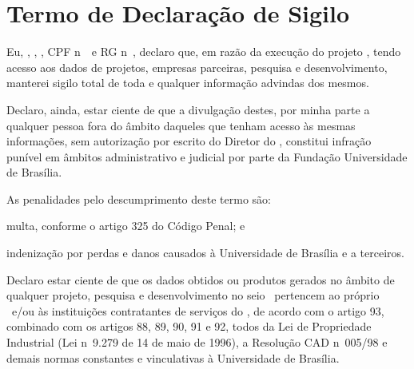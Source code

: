 
\cleardoublepage
   {\centering \section*{Termo de Declaração de Sigilo \label{sec:dec_sigilo}}}
   \vspace{1cm}
   Eu, \textbf{\pesquisador}, \pesqnacionalidade, \pesqestadocivil, CPF n\ele\ \pesqcpf\ e RG n\ele\ \pesqrg, declaro que, em razão da execução do projeto \projeto, tendo acesso aos dados de projetos, empresas parceiras, pesquisa e desenvolvimento, manterei sigilo total de toda e qualquer informação advindas dos mesmos.
   
   Declaro, ainda, estar ciente de que a divulgação destes, por minha parte a qualquer pessoa fora do âmbito daqueles que tenham acesso às mesmas informações, sem autorização por escrito do Diretor do \inova, constitui infração punível em âmbitos administrativo e judicial por parte da Fundação Universidade de Brasília.
   
   As penalidades pelo descumprimento deste termo são: 
   
   \begin{alineas}
       \item multa, conforme o artigo 325 do Código Penal; e
       \item indenização por perdas e danos causados à Universidade de Brasília e a terceiros.
   \end{alineas}
   
   Declaro estar ciente de que os dados obtidos ou produtos gerados no âmbito de qualquer projeto, pesquisa e desenvolvimento no seio \Inova\ pertencem ao próprio \inova\ e/ou às instituições contratantes de serviços do \inova, de acordo com o artigo 93, combinado com os artigos 88, 89, 90, 91 e 92, todos da Lei de Propriedade Industrial (Lei n\ele\ 9.279 de 14 de maio de 1996), a Resolução CAD n\ele\ 005/98 e demais normas constantes e vinculativas à Universidade de Brasília.
   
